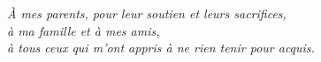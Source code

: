 \cleardoublepage
\thispagestyle{empty}
\vspace*{\fill}
\begin{flushright}
  \begin{minipage}{0.6\textwidth}
    \itshape
    À mes parents, pour leur soutien et leurs sacrifices,\\[4pt]
    à ma famille et à mes amis,\\[4pt]
    à tous ceux qui m'ont appris à ne rien tenir pour acquis.
  \end{minipage}
\end{flushright}
\vspace*{\fill}
